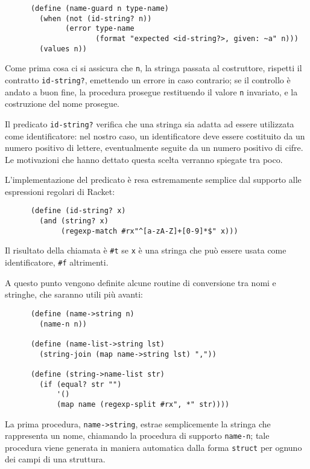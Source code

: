 \begin{lstlisting}
      (define (name-guard n type-name)
        (when (not (id-string? n))
              (error type-name
                     (format "expected <id-string?>, given: ~a" n)))
        (values n))
\end{lstlisting}

Come prima cosa ci si assicura che \lstinline{n}, la stringa passata al
costruttore, rispetti il contratto \lstinline{id-string?}, emettendo un
errore in caso contrario; se il controllo \`e andato a buon fine, la
procedura prosegue restituendo il valore \lstinline{n} invariato, e la
costruzione del nome prosegue.

Il predicato \lstinline{id-string?} verifica che una stringa sia adatta
ad essere utilizzata come identificatore: nel nostro caso, un
identificatore deve essere costituito da un numero positivo di lettere,
eventualmente seguite da un numero positivo di cifre. Le motivazioni che
hanno dettato questa scelta verranno spiegate tra poco.

L'implementazione del predicato \`e resa estremamente semplice dal supporto
alle espressioni regolari di Racket:

\begin{lstlisting}
      (define (id-string? x)
        (and (string? x)
             (regexp-match #rx"^[a-zA-Z]+[0-9]*$" x)))
\end{lstlisting}

Il risultato della chiamata \`e \lstinline{#t} se \lstinline{x} \`e una
stringa che pu\`o essere usata come identificatore, \lstinline{#f}
altrimenti.

A questo punto vengono definite alcune routine di conversione tra nomi e
stringhe, che saranno utili pi\`u avanti:

\begin{lstlisting}
      (define (name->string n)
        (name-n n))

      (define (name-list->string lst)
        (string-join (map name->string lst) ","))

      (define (string->name-list str)
        (if (equal? str "")
            '()
            (map name (regexp-split #rx", *" str))))
\end{lstlisting}

La prima procedura, \lstinline{name->string}, estrae semplicemente la
stringa che rappresenta un nome, chiamando la procedura di supporto
\lstinline{name-n}; tale procedura viene generata in maniera automatica
dalla forma \lstinline{struct} per ognuno dei campi di una struttura.

